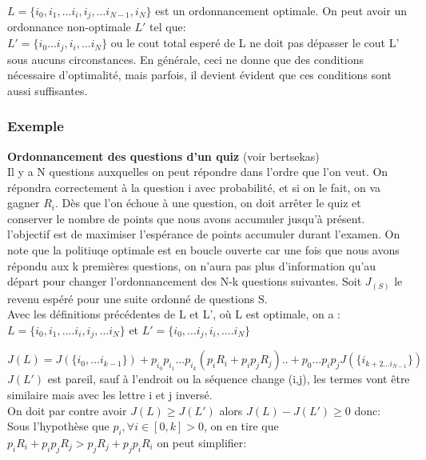 \documentclass[oneside]{book}
\begin{document}
$L = \{i_0, i_1,... i_i, i_j, ... i_{N-1}, i_N\}$ est un ordonnancement optimale. On peut avoir un ordonnance non-optimale $L'$ tel que:\\

$L' = \{i_0... i_j, i_i, ... i_N\}$ ou le cout total esperé de L ne doit pas dépasser le cout L' sous aucuns circonstances. En générale, ceci ne donne que des conditions nécessaire d'optimalité, mais parfois, il devient évident que ces conditions sont aussi suffisantes. \\

\subsubsection{Exemple}
\textbf{Ordonnancement des questions d'un quiz} (voir bertsekas)\\

Il y a N questions auxquelles on peut répondre dans l'ordre que l'on veut. On répondra correctement à la question i avec probabilité, et si on le fait, on va gagner $R_i$. Dès que l'on échoue à une question, on doit arrêter le quiz et conserver le nombre de points que nous avons accumuler jusqu'à présent. l'objectif est de maximiser l'espérance de points accumuler durant l'examen. On note que la politiuqe optimale est en boucle ouverte car une fois que nous avons répondu aux k premières questions, on n'aura pas plus d'information qu'au départ pour changer l'ordonnancement des N-k questions suivantes. Soit $J_(S)$ le revenu espéré pour une suite ordonné de questions S. \\

Avec les définitions précédentes de L et L', où L est optimale, on a :\\

$L = \{i_0, i_1,.... i_i, i_j,... i_N\} $  et  $ L' = \{i_0,... i_j, i_i, .... i_N\}$

$J(L) = J(\{i_0,... i_{k-1}\}) + p_{i_0}p_{i_1}...p_{i_k}(p_iR_i + p_ip_jR_j).. + p_0...p_ip_jJ(\{i_{k+2... i_{N-1}}\})$\\

$J(L')$ est pareil, sauf à l'endroit ou la séquence change (i,j), les termes vont être similaire mais avec les lettre i et j inversé.\\

On doit par contre avoir $J(L) \geq J(L')$ alors $J(L) - J(L') \geq 0$ donc:\\

Sous l'hypothèse que $p_i, \forall i \in [0,k] > 0$, on en tire que $p_iR_i + p_ip_jR_j > p_jR_j + p_jp_iR_i$ on peut simplifier:\\
\end{document}
